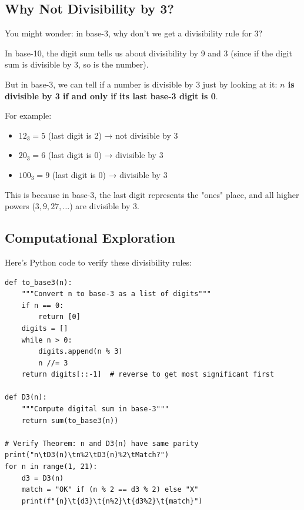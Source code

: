 \subsection{Why Not Divisibility by 3?}
\label{subsec:why-not-three}

You might wonder: in base-3, why don't we get a divisibility rule for 3?

\begin{intuitive}
In base-10, the digit sum tells us about divisibility by 9 and 3 (since if the digit sum is divisible by 3, so is the number).

But in base-3, we can tell if a number is divisible by 3 just by looking at it: \textbf{$n$ is divisible by 3 if and only if its last base-3 digit is 0}.

For example:
\begin{itemize}
\item $12_3 = 5$ (last digit is 2) → not divisible by 3
\item $20_3 = 6$ (last digit is 0) → divisible by 3
\item $100_3 = 9$ (last digit is 0) → divisible by 3
\end{itemize}

This is because in base-3, the last digit represents the "ones" place, and all higher powers ($3, 9, 27, \ldots$) are divisible by 3.
\end{intuitive}

\subsection{Computational Exploration}
\label{subsec:computational-divisibility}


Here's Python code to verify these divisibility rules:

\begin{lstlisting}[style=python]
def to_base3(n):
    """Convert n to base-3 as a list of digits"""
    if n == 0:
        return [0]
    digits = []
    while n > 0:
        digits.append(n % 3)
        n //= 3
    return digits[::-1]  # reverse to get most significant first

def D3(n):
    """Compute digital sum in base-3"""
    return sum(to_base3(n))

# Verify Theorem: n and D3(n) have same parity
print("n\tD3(n)\tn%2\tD3(n)%2\tMatch?")
for n in range(1, 21):
    d3 = D3(n)
    match = "OK" if (n % 2 == d3 % 2) else "X"
    print(f"{n}\t{d3}\t{n%2}\t{d3%2}\t{match}")
\end{lstlisting}

